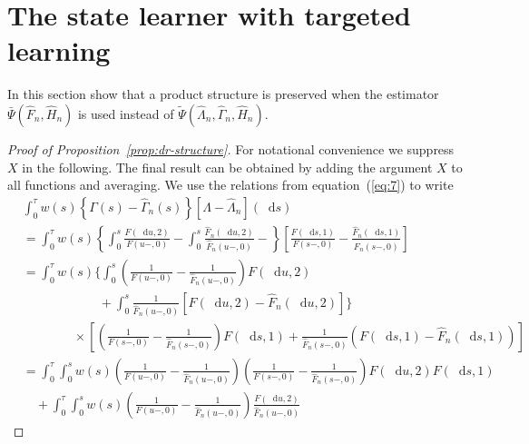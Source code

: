 \documentclass{statsoc}
\numberwithin{theorem}{section}
\newcommand*\diff{\mathop{}\!\mathrm{d}}
\newcommand{\1}{\mathds{1}}
\begin{document}
\section{The state learner with targeted learning}
\label{sec:state-learner-with}

In this section show that a product structure is preserved when the estimator
$\bar\Psi(\hat{F}_n, \hat{H}_n)$ is used instead of
$\tilde\Psi(\hat{\Lambda}_n, \hat{\Gamma}_n, \hat{H}_n)$.


\begin{proof}[Proof of Proposition~\ref{prop:dr-structure}]
  For notational convenience we suppress \( X \) in the following. The final
  result can be obtained by adding the argument \( X \) to all functions and
  averaging. We use the relations from equation~(\ref{eq:7}) to write
  \begin{align*}
    & \int_0^{\tau} w(s) 
      \left\{
      \Gamma(s) - \hat{\Gamma}_n(s)
      \right\}
      [\Lambda - \hat{\Lambda}_n](\diff s)
    \\
    & =
      \int_0^{\tau} w(s) 
      \left\{
      \int_0^s \frac{F(\diff u, 2)}{F(u-, 0)} -
      \int_0^s \frac{\hat{F}_n(\diff u, 2)}{\hat{F}_n(u-, 0)}  -
      \right\}
      \left[
      \frac{F(\diff s, 1)}{F(s-, 0)}
      - \frac{\hat{F}_n(\diff s, 1)}{\hat{F}_n(s-, 0)}
      \right]
    \\
    & =
      \int_0^{\tau} w(s) 
      \Bigg\{
      \int_0^s 
      \left(
      \frac{1}{F(u-, 0)} -  \frac{1}{\hat{F}_n(u-, 0)}
      \right) F(\diff u, 2)
    \\
    & \qquad\qquad \qquad
      +
      \int_0^s \frac{1}{\hat{F}_n(u-, 0)} 
      \left[
      F(\diff u, 2) - \hat{F}_n(\diff u, 2)
      \right]
      \Bigg\}
    \\
    & \qquad\qquad \times
      \left[
      \left(
      \frac{1}{F(s-, 0)} -
      \frac{1}{\hat{F}_n(s-, 0)}
      \right)F(\diff s, 1)
       + \frac{1}{\hat{F}_n(s-, 0)}
      \left(
      F(\diff s, 1) -
      \hat{F}_n(\diff s, 1)
      \right)
      \right]
    \\
    &
      = \int_0^{\tau} 
      \int_0^s
      w(s) 
      \left(
      \frac{1}{F(u-, 0)} -  \frac{1}{\hat{F}_n(u-, 0)}
      \right) 
      \left(
      \frac{1}{F(s-, 0)} -
      \frac{1}{\hat{F}_n(s-, 0)}
      \right)F(\diff u, 2)F(\diff s, 1)
    \\
    & \quad +
      \int_0^{\tau}
      \int_0^s
      w(s) 
      \left(
      \frac{1}{F(u-, 0)} -  \frac{1}{\hat{F}_n(u-, 0)}
      \right) \frac{F(\diff u, 2) }{\hat{F}_n(u-,0)}

\end{align*}
\end{proof}
\end{document}
